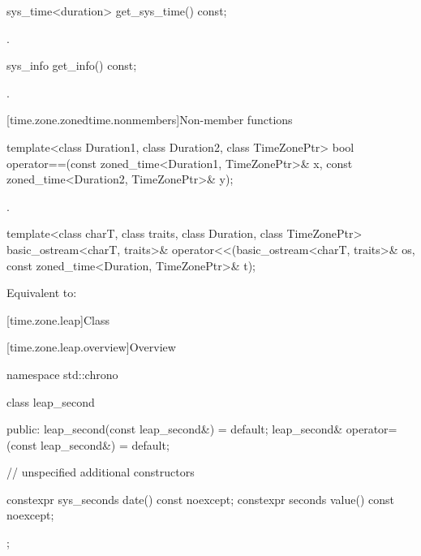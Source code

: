 %
\begin{itemdecl}
sys_time<duration> get_sys_time() const;
\end{itemdecl}

\begin{itemdescr}
\pnum
\returns
{}.
\end{itemdescr}

%
\begin{itemdecl}
sys_info get_info() const;
\end{itemdecl}

\begin{itemdescr}
\pnum
\returns
{}.
\end{itemdescr}

[time.zone.zonedtime.nonmembers]{Non-member functions}

%
\begin{itemdecl}
template<class Duration1, class Duration2, class TimeZonePtr>
  bool operator==(const zoned_time<Duration1, TimeZonePtr>& x,
                  const zoned_time<Duration2, TimeZonePtr>& y);
\end{itemdecl}

\begin{itemdescr}
\pnum
\returns
{}.
\end{itemdescr}

%
\begin{itemdecl}
template<class charT, class traits, class Duration, class TimeZonePtr>
  basic_ostream<charT, traits>&
    operator<<(basic_ostream<charT, traits>& os,
               const zoned_time<Duration, TimeZonePtr>& t);
\end{itemdecl}

\begin{itemdescr}
\pnum
\effects
Equivalent to:
\end{itemdescr}

[time.zone.leap]{Class }

[time.zone.leap.overview]{Overview}

\begin{codeblock}
namespace std::chrono {
  class leap_second {
  public:
    leap_second(const leap_second&)            = default;
    leap_second& operator=(const leap_second&) = default;

    // unspecified additional constructors

    constexpr sys_seconds date() const noexcept;
    constexpr seconds value() const noexcept;
  };
}
\end{codeblock}

